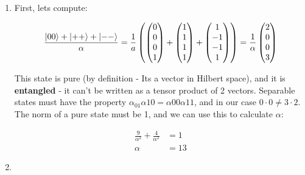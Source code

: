 \documentclass[a4paper,10pt]{hw}
\DeclarePairedDelimiter\ket{\lvert}{\rangle}
\begin{document}
\begin{enumerate}

\item

First, lets compute:

$$
\frac{\ket{00} + \ket{++} + \ket{--}}{\alpha} = \frac{1}{a}
\left( 
\begin{pmatrix}
0 \\ 0 \\ 0 \\ 1
\end{pmatrix}
+
\begin{pmatrix}
1 \\ 1 \\ 1 \\ 1
\end{pmatrix}
+
\begin{pmatrix}
1 \\ -1 \\ -1 \\ 1
\end{pmatrix}
\right)
=
\frac{1}{\alpha}
\begin{pmatrix}
2 \\ 0 \\ 0 \\ 3
\end{pmatrix}
$$

This state is pure (by definition - Its a vector in Hilbert space), and it is \textbf{entangled} - it can't be written as a tensor product of 2 vectors. Separable states must have the property $\alpha_{01}\alpha{10}=\alpha{00}\alpha{11}$, and in our case $0\cdot 0 \neq 3\cdot 2$.
The norm of a pure state must be 1, and we can use this to calculate $\alpha$:

\begin{align*}
\frac{9}{\alpha^2} + \frac{4}{\alpha^2} &= 1 \\
\alpha &= 13
\end{align*}

\item

\end{enumerate}
\end{document}
